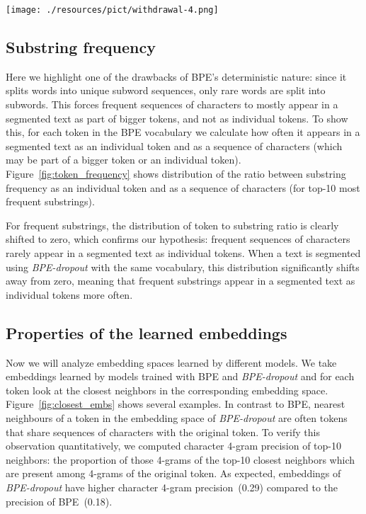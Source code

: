 \documentclass[11pt,a4paper]{article}
\begin{document}
\begin{figure*}[t!]
    \centering
    \texttt{[image: ./resources/pict/withdrawal-4.png]}
    \caption{Examples of nearest neighbours in the source embedding space of models trained with BPE and \textit{BPE-dropout}. Models trained on WMT14 En-Fr (4m).}
    \label{fig:closest_embs}
\end{figure*} 

\subsection{Substring frequency}

Here we highlight one of the drawbacks of BPE's deterministic nature: since it splits words into unique subword sequences, only rare words are split into subwords. This forces frequent sequences of characters to mostly appear in a segmented text as part of bigger tokens, and not as individual tokens. To show this, for each token in the BPE vocabulary we calculate how often it appears in a segmented text as an individual token and as a sequence of characters (which may be part of a bigger token or an individual token). Figure~\ref{fig:token_frequency} shows distribution of the ratio between substring frequency as an individual token and as a sequence of characters (for top-10 most frequent substrings).

For frequent substrings, the distribution of token to substring ratio is clearly shifted to zero, which confirms our hypothesis: frequent sequences of characters rarely appear in a segmented text as individual tokens. When a text is segmented using \textit{BPE-dropout} with the same vocabulary, this distribution significantly shifts away from zero, meaning that frequent substrings appear in a segmented text as individual tokens more often. 




\subsection{Properties of the learned embeddings}



    

Now we will analyze embedding spaces learned by different models.
We take embeddings learned by models trained with BPE and \textit{BPE-dropout} and for each token look at the closest neighbors in the corresponding embedding space.
Figure~\ref{fig:closest_embs} shows several examples. In contrast to BPE, nearest neighbours of a token in the embedding space of \textit{BPE-dropout} are often tokens that share sequences of characters with the original token. To verify this observation quantitatively, we computed character 4-gram precision of top-10 neighbors: the proportion of those 4-grams of the top-10 closest neighbors which are present among 4-grams of the original token. As expected, embeddings of \textit{BPE-dropout} have higher character 4-gram precision~(0.29) compared to the precision of BPE~(0.18).
\end{document}
